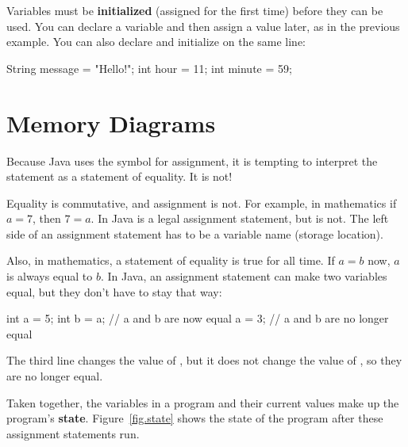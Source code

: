 
Variables must be {\bf initialized} (assigned for the first time) before they can be used.
You can declare a variable and then assign a value later, as in the previous example.
You can also declare and initialize on the same line:

\begin{code}
String message = "Hello!";
int hour = 11;
int minute = 59;
\end{code}

%
%
%


\section{Memory Diagrams}
\label{state}

Because Java uses the \java{=} symbol for assignment, it is tempting to interpret the statement  as a statement of equality.
It is not!

Equality is commutative, and assignment is not.
For example, in mathematics if $a = 7$, then $7 = a$.
In Java  is a legal assignment statement, but  is not.
The left side of an assignment statement has to be a variable name (storage location).

Also, in mathematics, a statement of equality is true for all time.
If $a = b$ now, $a$ is always equal to $b$.
In Java, an assignment statement can make two variables equal, but they don't have to stay that way:

\begin{code}
int a = 5;
int b = a;     // a and b are now equal
a = 3;         // a and b are no longer equal
\end{code}

The third line changes the value of , but it does not change the value of , so they are no longer equal.


Taken together, the variables in a program and their current values make up the program's {\bf state}.
Figure~\ref{fig.state} shows the state of the program after these assignment statements run.

